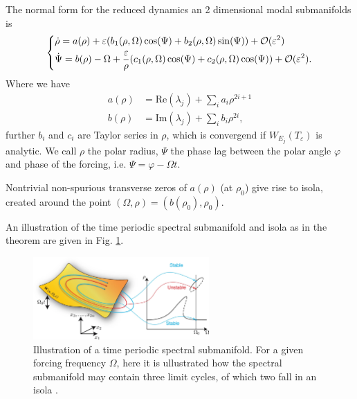 The normal form for the reduced dynamics an 2 dimensional modal submanifolds is
\begin{align}
	\begin{dcases}
	\dot{\rho} = a(\rho) + \varepsilon (b_1(\rho, \Omega) \cos(\Psi) + b_2(\rho, \Omega)\sin(\Psi)) + \mathcal{O}(\varepsilon^2)\\
	\dot{\Psi} = b(\rho) - \Omega + \frac{\varepsilon}{\rho}(c_1(\rho, \Omega) \cos(\Psi) + c_2(\rho, \Omega)\cos(\Psi))+ \mathcal{O}(\varepsilon^2). 
	\end{dcases}
\end{align}
Where we have
\begin{align}
	a(\rho) &=  \textrm{Re} (\lambda_j) + \sum_{i}^{} a_i \rho^{2i+1} \\
	b(\rho) &=  \textrm{Im} (\lambda_j) + \sum_{i}^{} b_i \rho^{2i}, 
\end{align}
further $b_i$ and $c_i$ are Taylor series in $\rho$, which is convergend if $W_{E_j}(T_\varepsilon)$ is analytic. We call $\rho $ the polar radius, $\Psi $ the phase lag between the polar angle $\varphi $ and phase of the forcing, i.e. $\Psi = \varphi-\Omega t$. 
\begin{theorem}[]
	Nontrivial non-spurious transverse zeros of $a(\rho)$ (at $\rho_0$) give rise to isola, created around the point $(\Omega, \rho) = (b(\rho_0), \rho_0)$.
\end{theorem}
An illustration of the time periodic spectral submanifold and isola as in the theorem are given in Fig. \ref{fig:time_periodic_ssm}.
\begin{figure}[h!]
	\centering
	\includegraphics[width=0.6\textwidth]{figures/ch9/time_periodic_ssm.pdf}
	\caption{Illustration of a time periodic spectral submanifold. For a given forcing frequency $\Omega  $, here it is ullustrated how the spectral submanifold may contain three limit cycles, of which two fall in an isola \cite{Ponsioen2020}.}
	\label{fig:time_periodic_ssm}
\end{figure}


